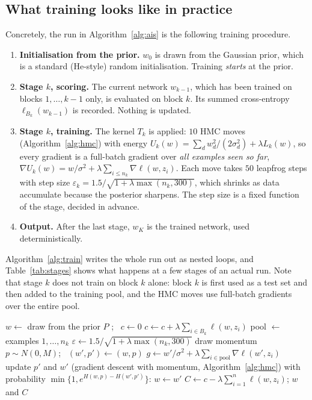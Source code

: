 \documentclass[11pt]{article}
\theoremstyle{definition}
\theoremstyle{remark}
\begin{document}
\subsection{What training looks like in practice}\label{sec:training}
Concretely, the run in Algorithm~\ref{alg:ais} is the following training procedure.
\begin{enumerate}[nosep]
\item \textbf{Initialisation from the prior.} $w_0$ is drawn from the Gaussian prior, which is a standard
  (He-style) random initialisation. Training \emph{starts} at the prior.
\item \textbf{Stage $k$, scoring.} The current network $w_{k-1}$, which has been trained on blocks $1,\dots,k-1$ only, is
  evaluated on block $k$. Its summed cross-entropy $\ell_{B_k}(w_{k-1})$ is recorded. Nothing is updated.
\item \textbf{Stage $k$, training.} The kernel $T_k$ is applied: $10$ HMC moves (Algorithm~\ref{alg:hmc}) with energy
  $U_k(w)=\sum_dw_d^2/(2\sigma_d^2)+\lambda L_k(w)$, so every gradient is a full-batch gradient over \emph{all examples seen
  so far}, $\nabla U_k(w)=w/\sigma^2+\lambda\sum_{i\le n_k}\nabla\ell(w,z_i)$. Each move takes $50$ leapfrog steps with step
  size $\varepsilon_k=1.5/\sqrt{1+\lambda\max(n_k,300)}$, which shrinks as data accumulate because the posterior
  sharpens. The step size is a fixed function of the stage, decided in advance.
\item \textbf{Output.} After the last stage, $w_K$ is the trained network, used deterministically.
\end{enumerate}
Algorithm~\ref{alg:train} writes the whole run out as nested loops, and Table~\ref{tab:stages} shows what happens at a
few stages of an actual run. Note that stage $k$ does not train on block $k$ alone: block $k$ is first used as a test set
and then added to the training pool, and the HMC moves use full-batch gradients over the entire pool.

\begin{algorithm}[h]
\caption{The training run of Algorithm~\ref{alg:ais}, written out}\label{alg:train}
\begin{algorithmic}[1]
\State $w\gets$ draw from the prior $P$ ; \ $c\gets0$
  \State $c\gets c+\lambda\sum_{i\in B_k}\ell(w,z_i)$ 
  \State pool $\gets$ examples $1,\dots,n_k$ 
  \State $\varepsilon\gets1.5/\sqrt{1+\lambda\max(n_k,300)}$ 
   
    \State draw momentum $p\sim N(0,M)$; \ $(w',p')\gets(w,p)$
      \State $g\gets w'/\sigma^2+\lambda\sum_{i\in\text{pool}}\nabla\ell(w',z_i)$ 
      \State update $p'$ and $w'$ (gradient descent with momentum, Algorithm~\ref{alg:hmc})
    \EndFor
    \State with probability $\min\{1,e^{H(w,p)-H(w',p')}\}$: $w\gets w'$ 
  \EndFor
\EndFor
\State $C\gets c-\lambda\sum_{i=1}^n\ell(w,z_i)$; \Return $w$ and $C$
\end{algorithmic}
\end{algorithm}
\end{document}
